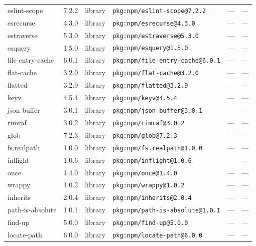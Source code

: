 \documentclass[11pt,a4paper]{article}
\begin{document}
\begin{longtable}{|p{4cm}|p{2cm}|p{1.6cm}|p{5cm}|p{1.5cm}|p{3.5cm}|}
\raggedright eslint-scope & 7.2.2 & library & \small\texttt{pkg:npm/eslint-scope@7.2.2} & — & \small — \\
\raggedright esrecurse & 4.3.0 & library & \small\texttt{pkg:npm/esrecurse@4.3.0} & — & \small — \\
\raggedright estraverse & 5.3.0 & library & \small\texttt{pkg:npm/estraverse@5.3.0} & — & \small — \\
\raggedright esquery & 1.5.0 & library & \small\texttt{pkg:npm/esquery@1.5.0} & — & \small — \\
\raggedright file-entry-cache & 6.0.1 & library & \small\texttt{pkg:npm/file-entry-cache@6.0.1} & — & \small — \\
\raggedright flat-cache & 3.2.0 & library & \small\texttt{pkg:npm/flat-cache@3.2.0} & — & \small — \\
\raggedright flatted & 3.2.9 & library & \small\texttt{pkg:npm/flatted@3.2.9} & — & \small — \\
\raggedright keyv & 4.5.4 & library & \small\texttt{pkg:npm/keyv@4.5.4} & — & \small — \\
\raggedright json-buffer & 3.0.1 & library & \small\texttt{pkg:npm/json-buffer@3.0.1} & — & \small — \\
\raggedright rimraf & 3.0.2 & library & \small\texttt{pkg:npm/rimraf@3.0.2} & — & \small — \\
\raggedright glob & 7.2.3 & library & \small\texttt{pkg:npm/glob@7.2.3} & — & \small — \\
\raggedright fs.realpath & 1.0.0 & library & \small\texttt{pkg:npm/fs.realpath@1.0.0} & — & \small — \\
\raggedright inflight & 1.0.6 & library & \small\texttt{pkg:npm/inflight@1.0.6} & — & \small — \\
\raggedright once & 1.4.0 & library & \small\texttt{pkg:npm/once@1.4.0} & — & \small — \\
\raggedright wrappy & 1.0.2 & library & \small\texttt{pkg:npm/wrappy@1.0.2} & — & \small — \\
\raggedright inherits & 2.0.4 & library & \small\texttt{pkg:npm/inherits@2.0.4} & — & \small — \\
\raggedright path-is-absolute & 1.0.1 & library & \small\texttt{pkg:npm/path-is-absolute@1.0.1} & — & \small — \\
\raggedright find-up & 5.0.0 & library & \small\texttt{pkg:npm/find-up@5.0.0} & — & \small — \\
\raggedright locate-path & 6.0.0 & library & \small\texttt{pkg:npm/locate-path@6.0.0} & — & \small — \\

\end{longtable}
\end{document}
